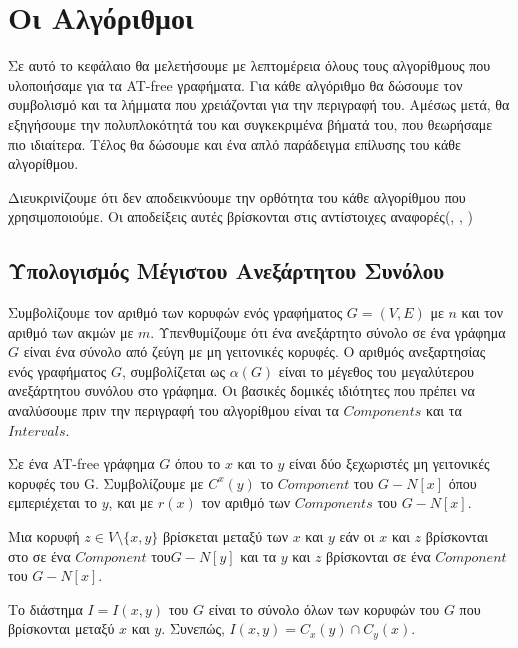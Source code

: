 \chapter{Οι Αλγόριθμοι}
\label{ch:Algorithms}

Σε αυτό το κεφάλαιο θα μελετήσουμε με λεπτομέρεια όλους τους αλγορίθμους που υλοποιήσαμε για τα AT-free γραφήματα.
Για κάθε αλγόριθμο θα δώσουμε τον συμβολισμό και τα λήμματα που χρειάζονται για την περιγραφή του. Αμέσως μετά, θα εξηγήσουμε την πολυπλοκότητά του και συγκεκριμένα βήματά του, που θεωρήσαμε πιο ιδιαίτερα. Τέλος θα δώσουμε και ένα απλό παράδειγμα επίλυσης του κάθε αλγορίθμου.

Διευκρινίζουμε ότι δεν αποδεικνύουμε την ορθότητα του κάθε αλγορίθμου που χρησιμοποιούμε. Οι αποδείξεις αυτές βρίσκονται στις αντίστοιχες αναφορές(\cite{at-free-independent-sets}, \cite{at-free-domination}, \cite{at-free-3-colouring})   

\section{Υπολογισμός Μέγιστου Ανεξάρτητου Συνόλου}
\label{sec:Independent_Set_Alg}
Συμβολίζουμε τον αριθμό των κορυφών ενός γραφήματος $G = (V, E)$ με
$n$ και τον αριθμό των ακμών με $m$. 
Υπενθυμίζουμε ότι ένα ανεξάρτητο σύνολο σε ένα γράφημα $G$ είναι ένα σύνολο από ζεύγη με μη γειτονικές
κορυφές. Ο αριθμός ανεξαρτησίας ενός γραφήματος $G$, συμβολίζεται ως $\alpha(G)$ είναι το μέγεθος
του μεγαλύτερου ανεξάρτητου συνόλου στο γράφημα. Οι βασικές δομικές ιδιότητες που πρέπει να αναλύσουμε πριν την περιγραφή του αλγορίθμου είναι τα $Components$ και τα $Intervals$.


Σε ένα AT-free γράφημα $G$ όπου το $x$ και το $y$ είναι δύο ξεχωριστές μη γειτονικές κορυφές του G. Συμβολίζουμε με $C^{x}(y)$ το $Component$ του $G - N[x]$ όπου εμπεριέχεται το $y$, και με $r(x)$ τον αριθμό των $Components$ του $G - N[x]$.

\begin{definition}
	Μια κορυφή $z \in V \setminus \{x, y\}$ βρίσκεται μεταξύ των $x$ και $y$ εάν οι $x$ και $z$ βρίσκονται στο
	σε ένα $Component$ του$ G - N [y]$ και τα $y$ και $z$ βρίσκονται σε ένα $Component$ του $G - N [x]$.
\end{definition}

\begin{definition}
	Το διάστημα $I = I(x, y)$ του $G$ είναι το σύνολο όλων των κορυφών του $G$ που βρίσκονται μεταξύ $x$ και $y$. Συνεπώς, $I(x, y) = C_x(y) \cap C_y(x)$.
\end{definition}

